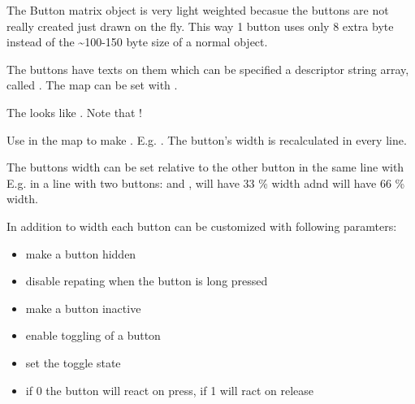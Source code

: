 \documentclass[letterpaper,10pt,english]{sphinxmanual}
\begin{document}
The Button matrix object is very light weighted becasue the buttons are not really created just drawn on the fly.
This way 1 button uses only 8 extra byte instead of the \textasciitilde{}100-150 byte size of a normal {\hyperref[\detokenize{object-types/btn::doc}]{}} object.

The buttons have texts on them which can be specified a descriptor string array, called . The map can be set with .

The  looks like . Note that !

Use  in the map  to make . E.g. . The button’s width is recalculated in every line.

The buttons width can be set relative to the other button in the same line with 
E.g. in a line with two buttons:  and ,  will have 33 \% width adnd  will have 66 \% width.

In addition to width each button can be customized with following paramters:
\begin{itemize}
\item {} 
 make a button hidden

\item {} 
 disable repating when the button is long pressed

\item {} 
 make a button inactive

\item {} 
 enable toggling of a button

\item {} 
 set the toggle state

\item {} 
 if 0 the button will react on press, if 1 will ract on release

\end{itemize}
\end{document}
